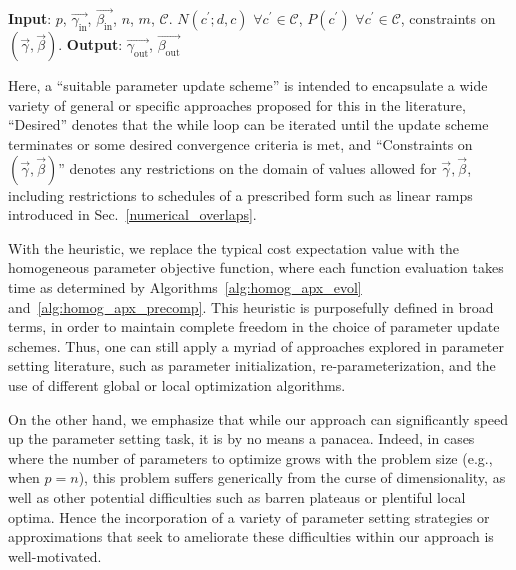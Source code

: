 \documentclass[superscriptaddress,pra,aps,10pt,longbibliography,notitlepage]{revtex4-1}
\newcommand*\cp{c^\prime}
\begin{document}
\vspace{2mm}
\begin{algorithm}[h]
\caption{Homogeneous Heuristic for Parameter Setting}\label{alg:homog_param_set}
\begin{algorithmic}
\STATE \textbf{Input}: $p$, $\vec{\gamma_{\mathrm{in}}}$, $\vec{\beta_{\mathrm{in}}}$, $n$, $m$, $\mathcal{C}$. $N(\cp;d,c)$ $\forall \cp\in \mathcal{C}$, $P(\cp)$ $\forall \cp\in \mathcal{C}$, constraints on $(\vec{\gamma}, \vec{\beta})$. 
\STATE \textbf{Output}: $\vec{\gamma_{\mathrm{out}}}$, $\vec{\beta_{\mathrm{out}}}$
\ENDWHILE
{}
\\\hrulefill
\end{algorithmic}
\end{algorithm}

Here, a ``suitable parameter update scheme'' is intended to encapsulate a wide variety of general or specific approaches proposed for this in the literature, ``Desired'' denotes that the while loop can be iterated until the update scheme terminates or some desired convergence criteria is met, and ``Constraints on $(\vec{\gamma}, \vec{\beta})$'' denotes any restrictions on the domain of values allowed for $\vec{\gamma}, \vec{\beta}$, including restrictions to schedules of a prescribed form such as linear ramps introduced in Sec.~\ref{numerical_overlaps}. 

With the heuristic, we replace the typical cost expectation value with the homogeneous parameter objective function, where each function evaluation takes time as determined by Algorithms~\ref{alg:homog_apx_evol} and~\ref{alg:homog_apx_precomp}. This heuristic is purposefully defined in broad terms, in order to maintain complete freedom in the choice of parameter update schemes. Thus, one can still apply a myriad of approaches explored in parameter setting literature, such as parameter initialization, re-parameterization, and the use of different global or local optimization algorithms. 

On the other hand, we emphasize that while our approach can significantly speed up the parameter setting task, it is by no means a panacea. Indeed, in cases where the number of parameters to optimize grows with the problem size (e.g., when $p=n$), this problem suffers generically from the curse of dimensionality, as well as other potential difficulties such as barren plateaus or plentiful local optima. Hence the incorporation of a variety of parameter setting strategies or approximations that seek to ameliorate these difficulties within our approach is well-motivated.
\end{document}
